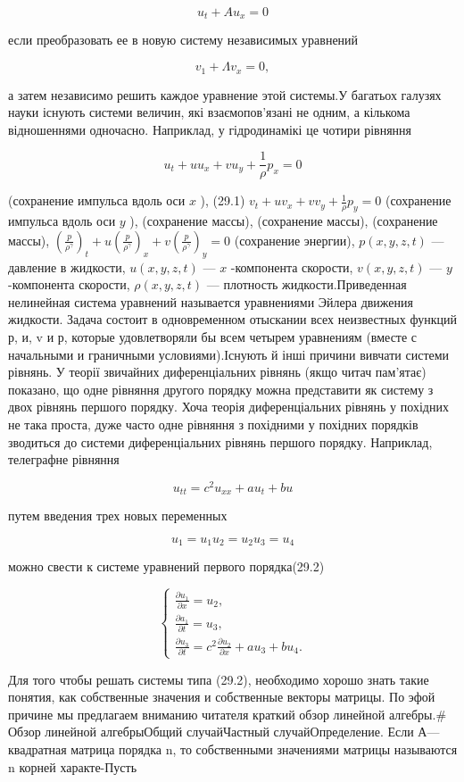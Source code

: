 \documentclass[
  ukrainian,
]{article}
\begin{document}
\[
u_t + Au_x = 0
\]

если преобразовать ее в новую систему независимых уравнений

\[
v_1 + \Lambda v_x = 0,
\]

а затем независимо решить каждое уравнение этой системы.У багатьох
галузях науки існують системи величин, які взаємопов'язані не одним, а
кількома відношеннями одночасно. Наприклад, у гідродинамікі це чотири
рівняння

\[
u_t + uu_x + vu_y + \frac{1}{\rho} p_x = 0
\]

(сохранение импульса вдоль оси \(x\) ), (29.1)
\(v_t + uv_x + vv_y + \frac{1}{\rho} p_y = 0\) (сохранение импульса
вдоль оси \(y\) ), (сохранение массы), (сохранение массы), (сохранение
массы),
\(\left(\frac{p}{\rho^{\gamma}}\right)_t + u\left(\frac{p}{\rho^{\gamma}}\right)_x + v\left(\frac{p}{\rho^{\gamma}}\right)_y = 0\)
(сохранение энергии), \(p(x, y, z, t)\) --- давление в жидкости,
\(u(x, y, z, t)\) --- \(x\) -компонента скорости, \(v(x, y, z, t)\) ---
\(y\) -компонента скорости, \(\rho(x, y, z, t)\) --- плотность
жидкости.Приведенная нелинейная система уравнений называется уравнениями
Эйлера движения жидкости. Задача состоит в одновременном отыскании всех
неизвестных функций р, и, v и р, которые удовлетворяли бы всем четырем
уравнениям (вместе с начальными и граничными условиями).Існують й інші
причини вивчати системи рівнянь. У теорії звичайних диференціальних
рівнянь (якщо читач пам'ятає) показано, що одне рівняння другого порядку
можна представити як систему з двох рівнянь першого порядку. Хоча теорія
диференціальних рівнянь у похідних не така проста, дуже часто одне
рівняння з похідними у похідних порядків зводиться до системи
диференціальних рівнянь першого порядку. Наприклад, телеграфне рівняння

\[
u_{tt} = c^2 u_{xx} + a u_t + b u
\]

путем введения трех новых переменных

\[
u_1 = u_1
u_2 = u_2
u_3 = u_4
\]

можно свести к системе уравнений первого порядка(29.2)

\[
\begin{cases} \frac{\partial u_1}{\partial x} = u_2, \\ \frac{\partial a_1}{\partial t} = u_3, \\ \frac{\partial u_3}{\partial t} = c^2 \frac{\partial u_2}{\partial x} + au_3 + bu_4. \end{cases}
\]

Для того чтобы решать системы типа (29.2), необходимо хорошо знать такие
понятия, как собственные значения и собственные векторы матрицы. По эфой
причине мы предлагаем вниманию читателя краткий обзор линейной
алгебры.\# Обзор линейной алгебрыОбщий случайЧастный случайОпределение.
Если А---квадратная матрица порядка n, то собственными значениями
матрицы называются n корней характе-Пусть
\end{document}
